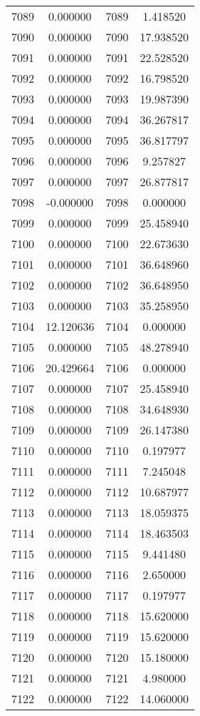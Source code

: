 \documentclass[12pt]{article}
\begin{document}
\begin{longtable}{@{}cccc@{}}
7089 & 0.000000 & 7089 & 1.418520 \\
7090 & 0.000000 & 7090 & 17.938520 \\
7091 & 0.000000 & 7091 & 22.528520 \\
7092 & 0.000000 & 7092 & 16.798520 \\
7093 & 0.000000 & 7093 & 19.987390 \\
7094 & 0.000000 & 7094 & 36.267817 \\
7095 & 0.000000 & 7095 & 36.817797 \\
7096 & 0.000000 & 7096 & 9.257827 \\
7097 & 0.000000 & 7097 & 26.877817 \\
7098 & -0.000000 & 7098 & 0.000000 \\
7099 & 0.000000 & 7099 & 25.458940 \\
7100 & 0.000000 & 7100 & 22.673630 \\
7101 & 0.000000 & 7101 & 36.648960 \\
7102 & 0.000000 & 7102 & 36.648950 \\
7103 & 0.000000 & 7103 & 35.258950 \\
7104 & 12.120636 & 7104 & 0.000000 \\
7105 & 0.000000 & 7105 & 48.278940 \\
7106 & 20.429664 & 7106 & 0.000000 \\
7107 & 0.000000 & 7107 & 25.458940 \\
7108 & 0.000000 & 7108 & 34.648930 \\
7109 & 0.000000 & 7109 & 26.147380 \\
7110 & 0.000000 & 7110 & 0.197977 \\
7111 & 0.000000 & 7111 & 7.245048 \\
7112 & 0.000000 & 7112 & 10.687977 \\
7113 & 0.000000 & 7113 & 18.059375 \\
7114 & 0.000000 & 7114 & 18.463503 \\
7115 & 0.000000 & 7115 & 9.441480 \\
7116 & 0.000000 & 7116 & 2.650000 \\
7117 & 0.000000 & 7117 & 0.197977 \\
7118 & 0.000000 & 7118 & 15.620000 \\
7119 & 0.000000 & 7119 & 15.620000 \\
7120 & 0.000000 & 7120 & 15.180000 \\
7121 & 0.000000 & 7121 & 4.980000 \\
7122 & 0.000000 & 7122 & 14.060000 \\

\end{longtable}
\end{document}
